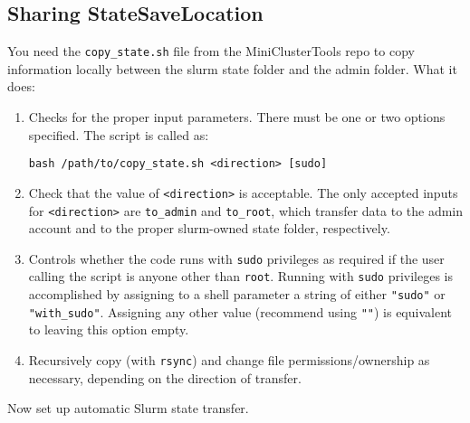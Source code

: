 \subsection{Sharing StateSaveLocation} \label{subsec:shareStateSave}

You need the \texttt{copy\_state.sh} file from the MiniClusterTools repo to copy information locally between the slurm state folder and the admin folder. What it does:

\begin{enumerate}
	\item Checks for the proper input parameters. There must be one or two options specified. The script is called as:

		\texttt{bash /path/to/copy\_state.sh <direction> [sudo]}

	\item Check that the value of \texttt{<direction>} is acceptable. The only accepted inputs for \texttt{<direction>} are \texttt{to\_admin} and \texttt{to\_root}, which transfer data to the admin account and to the proper slurm-owned state folder, respectively. 

	\item Controls whether the code runs with \texttt{sudo} privileges as required if the user calling the script is anyone other than \texttt{root}. Running with \texttt{sudo} privileges is accomplished by assigning to a shell parameter a string of either \texttt{"sudo"} or \texttt{"with\_sudo"}. Assigning any other value (recommend using \texttt{""}) is equivalent to leaving this option empty.

	\item Recursively copy (with \texttt{rsync}) and change file permissions/ownership as necessary, depending on the direction of transfer.
\end{enumerate}

Now set up automatic Slurm state transfer.

